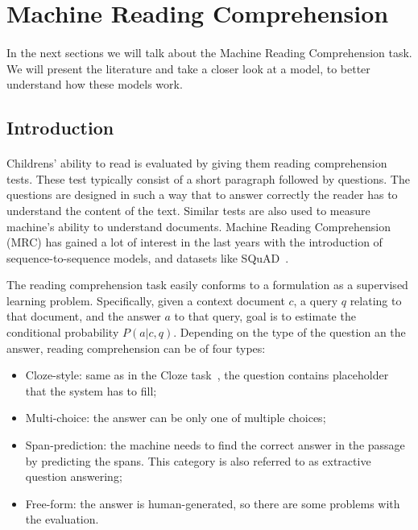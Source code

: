 \section{Machine Reading Comprehension}
\label{sec:sota_mc}
\paragraph{}
In the next sections we will talk about the Machine Reading Comprehension task. We will present the literature and take a closer look at a model, to better understand how these models work.

\subsection{Introduction}
\paragraph{}
Childrens' ability to read is evaluated by giving them reading comprehension tests. These test typically consist of a short paragraph followed by questions. The questions are designed in such a way that to answer correctly the reader has to understand the content of the text. Similar tests are also used to measure machine's ability to understand documents. Machine Reading Comprehension (MRC) has gained a lot of interest in the last years with the introduction of sequence-to-sequence models, and datasets like SQuAD~\citep{rajpurkar2016squad, rajpurkar-etal-2018-know}. 

The reading comprehension task easily conforms to a formulation as a supervised learning problem. Specifically, given a context document $c$,  a query $q$ relating to that document, and the answer $a$ to that query,  goal is to estimate the conditional probability $P(a|c, q)$. Depending on the type of the question an the answer, reading comprehension can be of four types:

\begin{itemize}[- ,noitemsep]
    \item Cloze-style: same as in the Cloze task~\citep{taylor1953cloze}, the question contains placeholder that the system has to fill;
    \item Multi-choice: the answer can be only one of multiple choices;
    \item Span-prediction: the machine needs to find the correct answer in the passage by predicting the spans. This category is also referred to as extractive question answering;
    \item Free-form: the answer is human-generated, so there are some problems with the evaluation.
\end{itemize}

